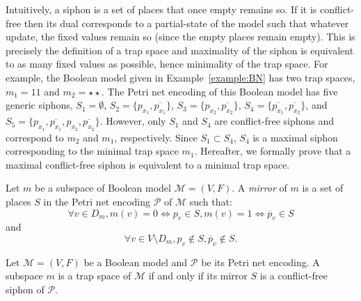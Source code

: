 \documentclass[runningheads]{llncs}
\begin{document}
Intuitively, a siphon is a set of places that once empty remains so.
If it is conflict-free then its dual corresponds to a partial-state of the model such that whatever update, the fixed values remain so (since the empty places remain empty).
This is precisely the definition of a trap space and maximality of the siphon is equivalent to as many fixed values as possible, hence minimality of the trap space.
For example, the Boolean model given in Example~\ref{example:BN} has two trap spaces, \(m_1 = 11\) and \(m_2 = \star\star\).
The Petri net encoding of this Boolean model has five generic siphons, \(S_1 = \emptyset\), \(S_2 = \{p_{x_1}, \overline{p_{x_1}}\}\), \(S_3 = \{p_{x_2}, \overline{p_{x_2}}\}\), \(S_4 = \{\overline{p_{x_1}}, \overline{p_{x_2}}\}\), and \(S_5 = \{p_{x_1}, \overline{p_{x_1}}, p_{x_2}, \overline{p_{x_2}}\}\).
However, only \(S_1\) and \(S_4\) are conflict-free siphons and correspond to \(m_2\) and \(m_1\), respectively.
Since \(S_1 \subset S_4\), \(S_4\) is a maximal siphon corresponding to the minimal trap space \(m_1\).
Hereafter, we formally prove that a maximal conflict-free siphon is equivalent to a minimal trap space.

\begin{definition}

  Let \(m\) be a subspace of Boolean model \(\mathcal{M} = (V, F)\). A \emph{mirror} of $m$ is a set of places $S$ in the Petri net encoding \(\mathcal{P}\) of \(\mathcal{M}\) such that:
  \[\forall v \in D_m, m(v) = 0 \Leftrightarrow p_v \in S, m(v) = 1 \Leftrightarrow \overline{p}_v \in S\] and \[\forall v \in V \setminus D_m, p_v \not \in S, \overline{p}_v \not \in S.\]

\end{definition}

\begin{theorem}
\label{theo:ts_2_sp}

  Let \(\mathcal{M} = (V, F)\) be a Boolean model and \(\mathcal{P}\) be its Petri net encoding. A subspace \(m\) is a trap space of \(\mathcal{M}\) if and only if its mirror \(S\) is a conflict-free siphon of \(\mathcal{P}\).

\end{theorem}
\end{document}
